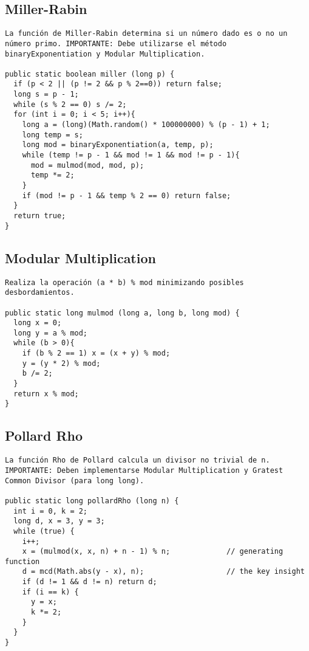 \documentclass[10pt,letterpaper,twocolumn,twosided]{article}
\begin{document}
\subsection{Miller-Rabin}
\begin{lstlisting}
La función de Miller-Rabin determina si un número dado es o no un número primo. IMPORTANTE: Debe utilizarse el método binaryExponentiation y Modular Multiplication.

public static boolean miller (long p) {
  if (p < 2 || (p != 2 && p % 2==0)) return false;
  long s = p - 1;
  while (s % 2 == 0) s /= 2;
  for (int i = 0; i < 5; i++){
    long a = (long)(Math.random() * 100000000) % (p - 1) + 1;
    long temp = s;
    long mod = binaryExponentiation(a, temp, p);
    while (temp != p - 1 && mod != 1 && mod != p - 1){
      mod = mulmod(mod, mod, p);
      temp *= 2;
    }
    if (mod != p - 1 && temp % 2 == 0) return false;
  }    
  return true;
}
\end{lstlisting}

\subsection{Modular Multiplication}
\begin{lstlisting}
Realiza la operación (a * b) % mod minimizando posibles desbordamientos.

public static long mulmod (long a, long b, long mod) {
  long x = 0;
  long y = a % mod;
  while (b > 0){
    if (b % 2 == 1) x = (x + y) % mod;
    y = (y * 2) % mod;
    b /= 2;
  }
  return x % mod;
}\end{lstlisting}

\subsection{Pollard Rho}
\begin{lstlisting}
La función Rho de Pollard calcula un divisor no trivial de n. IMPORTANTE: Deben implementarse Modular Multiplication y Gratest Common Divisor (para long long).

public static long pollardRho (long n) {
  int i = 0, k = 2;
  long d, x = 3, y = 3;
  while (true) {
    i++;
    x = (mulmod(x, x, n) + n - 1) % n;             // generating function
    d = mcd(Math.abs(y - x), n);                   // the key insight
    if (d != 1 && d != n) return d;
    if (i == k) { 
      y = x; 
      k *= 2;
    }
  }
}\end{lstlisting}
\end{document}
